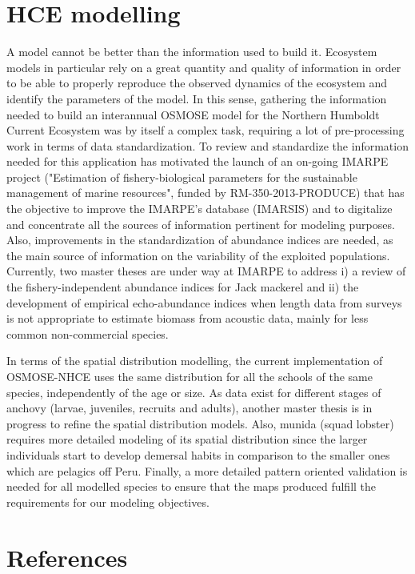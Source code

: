 \section*{HCE modelling} 


A model cannot be better than the information used to build it. Ecosystem models in particular rely on a great quantity and quality of information in order to be able to properly reproduce the observed dynamics of the ecosystem and identify the parameters of the model. In this sense, gathering the information needed to build an interannual OSMOSE model for the Northern Humboldt Current Ecosystem was by itself a complex task, requiring a lot of pre-processing work in terms of data standardization. To review and standardize the information needed for this application has motivated the launch of an on-going IMARPE project ("Estimation of fishery-biological parameters for the sustainable management of marine resources", funded by RM-350-2013-PRODUCE) that has the objective to improve the IMARPE's database (IMARSIS) and to digitalize and concentrate all the sources of information pertinent for modeling purposes. Also, improvements in the standardization of abundance indices are needed, as the main source of information on the variability of the exploited populations. Currently, two master theses are under way at IMARPE to address i) a review of the fishery-independent abundance indices for Jack mackerel and ii) the development of empirical echo-abundance indices when length data from surveys is not appropriate to estimate biomass from acoustic data, mainly for less common non-commercial species.


In terms of the spatial distribution modelling, the current implementation of OSMOSE-NHCE uses the same distribution for all the schools of the same species, independently of the age or size. As data exist for different stages of anchovy (larvae, juveniles, recruits and adults), another master thesis is in progress to refine the spatial distribution models. Also, munida (squad lobster) requires more detailed modeling of its spatial distribution since the larger individuals start to develop demersal habits in comparison to the smaller ones which are pelagics off Peru. Finally, a more detailed pattern oriented validation is needed for all modelled species to ensure that the maps produced fulfill the requirements for our modeling objectives.


\section*{References}

